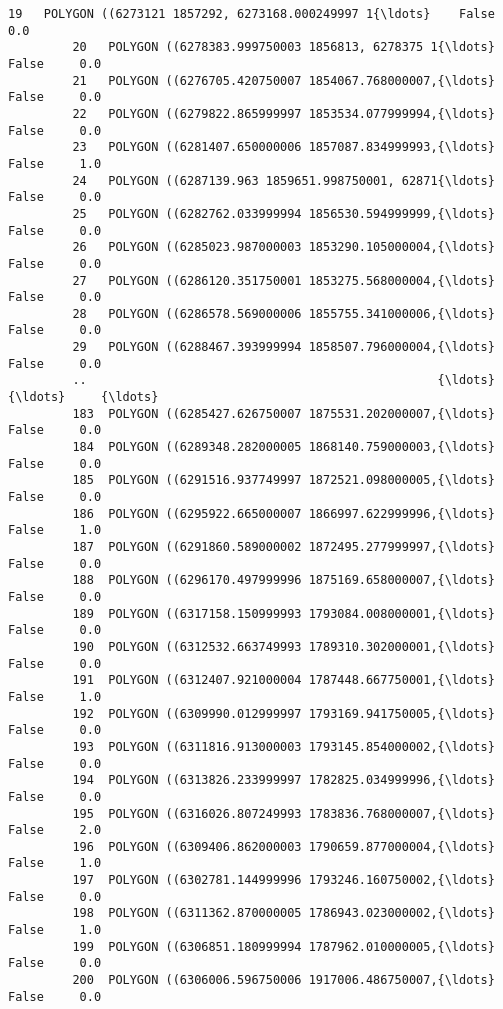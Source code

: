 \documentclass[11pt]{article}
\begin{document}
\begin{Verbatim}[commandchars=\\\{\}]
         19   POLYGON ((6273121 1857292, 6273168.000249997 1{\ldots}    False     0.0   
         20   POLYGON ((6278383.999750003 1856813, 6278375 1{\ldots}    False     0.0   
         21   POLYGON ((6276705.420750007 1854067.768000007,{\ldots}    False     0.0   
         22   POLYGON ((6279822.865999997 1853534.077999994,{\ldots}    False     0.0   
         23   POLYGON ((6281407.650000006 1857087.834999993,{\ldots}    False     1.0   
         24   POLYGON ((6287139.963 1859651.998750001, 62871{\ldots}    False     0.0   
         25   POLYGON ((6282762.033999994 1856530.594999999,{\ldots}    False     0.0   
         26   POLYGON ((6285023.987000003 1853290.105000004,{\ldots}    False     0.0   
         27   POLYGON ((6286120.351750001 1853275.568000004,{\ldots}    False     0.0   
         28   POLYGON ((6286578.569000006 1855755.341000006,{\ldots}    False     0.0   
         29   POLYGON ((6288467.393999994 1858507.796000004,{\ldots}    False     0.0   
         ..                                                 {\ldots}      {\ldots}     {\ldots}   
         183  POLYGON ((6285427.626750007 1875531.202000007,{\ldots}    False     0.0   
         184  POLYGON ((6289348.282000005 1868140.759000003,{\ldots}    False     0.0   
         185  POLYGON ((6291516.937749997 1872521.098000005,{\ldots}    False     0.0   
         186  POLYGON ((6295922.665000007 1866997.622999996,{\ldots}    False     1.0   
         187  POLYGON ((6291860.589000002 1872495.277999997,{\ldots}    False     0.0   
         188  POLYGON ((6296170.497999996 1875169.658000007,{\ldots}    False     0.0   
         189  POLYGON ((6317158.150999993 1793084.008000001,{\ldots}    False     0.0   
         190  POLYGON ((6312532.663749993 1789310.302000001,{\ldots}    False     0.0   
         191  POLYGON ((6312407.921000004 1787448.667750001,{\ldots}    False     1.0   
         192  POLYGON ((6309990.012999997 1793169.941750005,{\ldots}    False     0.0   
         193  POLYGON ((6311816.913000003 1793145.854000002,{\ldots}    False     0.0   
         194  POLYGON ((6313826.233999997 1782825.034999996,{\ldots}    False     0.0   
         195  POLYGON ((6316026.807249993 1783836.768000007,{\ldots}    False     2.0   
         196  POLYGON ((6309406.862000003 1790659.877000004,{\ldots}    False     1.0   
         197  POLYGON ((6302781.144999996 1793246.160750002,{\ldots}    False     0.0   
         198  POLYGON ((6311362.870000005 1786943.023000002,{\ldots}    False     1.0   
         199  POLYGON ((6306851.180999994 1787962.010000005,{\ldots}    False     0.0   
         200  POLYGON ((6306006.596750006 1917006.486750007,{\ldots}    False     0.0   

\end{Verbatim}
\end{document}
